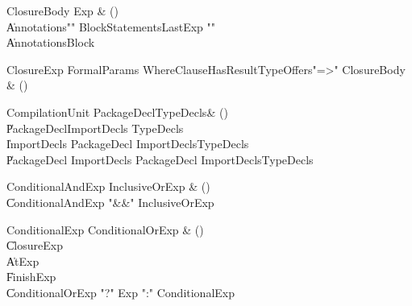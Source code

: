 \begin{bbgrammar}

ClosureBody \label{prod:ClosureBody}  \: Exp & () \\

    \| Annotations\opt \xcd"{" BlockStatements\opt LastExp \xcd"}" \\
    \| Annotations\opt Block \\

\end{bbgrammar}

\begin{bbgrammar}

ClosureExp \label{prod:ClosureExp}  \: FormalParams WhereClause\opt HasResultType\opt Offers\opt \xcd"=>" ClosureBody & () \\


\end{bbgrammar}

\begin{bbgrammar}

CompilationUnit \label{prod:CompilationUnit}  \: PackageDecl\opt TypeDecls\opt & () \\

    \| PackageDecl\opt ImportDecls TypeDecls\opt \\
    \| ImportDecls PackageDecl  ImportDecls\opt  TypeDecls\opt \\
    \| PackageDecl ImportDecls PackageDecl  ImportDecls\opt  TypeDecls\opt \\

\end{bbgrammar}

\begin{bbgrammar}

ConditionalAndExp \label{prod:ConditionalAndExp}  \: InclusiveOrExp & () \\

    \| ConditionalAndExp \xcd"&&" InclusiveOrExp \\

\end{bbgrammar}

\begin{bbgrammar}

ConditionalExp \label{prod:ConditionalExp}  \: ConditionalOrExp & () \\

    \| ClosureExp \\
    \| AtExp \\
    \| FinishExp \\
    \| ConditionalOrExp \xcd"?" Exp \xcd":" ConditionalExp \\

\end{bbgrammar}

